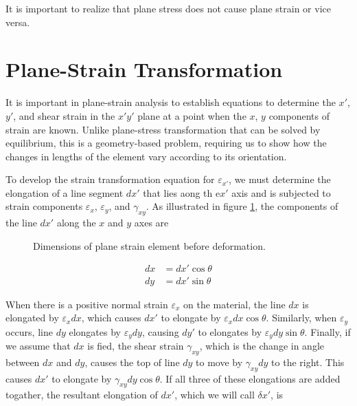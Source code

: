 \documentclass[
10pt,
a4paper,
openany,
svgnames,
]{book} %
\begin{document}
It is important to realize that plane stress does not cause plane strain or vice versa.

\section{Plane-Strain Transformation}

It is important in plane-strain analysis to establish equations to determine the $x'$, $y'$, and shear strain in the $x'y'$ plane at a point when the $x$, $y$ components of strain are known. Unlike plane-stress transformation that can be solved by equilibrium, this is a geometry-based problem, requiring us to show how the changes in lengths of the element vary according to its orientation.

To develop the strain transformation equation for $\varepsilon_{x'}$, we must determine the elongation of a line segment $dx'$ that lies aong th e$x'$ axis and is subjected to strain components $\varepsilon_x$, $\varepsilon_y$, and $\gamma_{xy}$. As illustrated in figure \cref{fig: plane strain before deformation}, the components of the line $dx'$ along the $x$ and $y$ axes are

\begin{figure}[h]
  \centering
  \caption{Dimensions of plane strain element before deformation.}
  \label{fig: plane strain before deformation}
\end{figure}

\begin{align*}
  dx &= dx' \cos \theta \\
  dy &= dx' \sin \theta
\end{align*}

When there is a positive normal strain $\varepsilon_x$ on the material, the line $dx$ is elongated by $\varepsilon_x dx$, which causes $dx'$ to elongate by $\varepsilon_x dx \cos \theta$. Similarly, when $\varepsilon_y$ occurs, line $dy$ elongates by $\varepsilon_y dy$, causing $dy'$ to elongates by $\varepsilon_y dy \sin \theta$. Finally, if we assume that $dx$ is fied, the shear strain $\gamma_{xy}$, which is the change in angle between $dx$ and $dy$, causes the top of line $dy$ to move by $\gamma_{xy} dy$ to the right. This causes $dx'$ to elongate by $\gamma_{xy} dy \cos \theta$. If all three of these elongations are added togather, the resultant elongation of $dx'$, which we will call $\delta x'$, is
\end{document}
